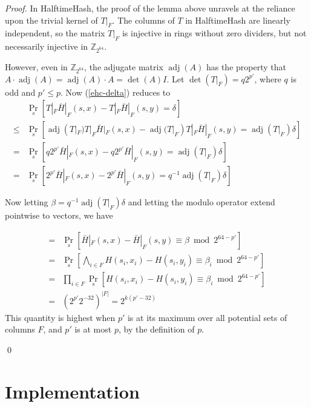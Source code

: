 \documentclass[runningheads]{llncs}
\DeclareMathOperator{\adj}{adj}
\newcommand{\ints}{\mathbb{Z}}
\begin{document}
\begin{proof}
  In HalftimeHash, the proof of the lemma above unravels at the reliance upon the trivial kernel of $T|_F$.
  The columns of $T$ in HalftimeHash are linearly independent, so the matrix $T|_F$ is injective in rings without zero dividers, but not necessarily injective in $\ints_{2^{64}}$.

  However, even in $\ints_{2^{64}}$, the adjugate matrix $\adj(A)$ has the property that $A \cdot \adj(A) = \adj(A) \cdot A = \det(A) I$.
  Let $\det(T|_F) = q2^{p'}$, where $q$ is odd and $p' \le p$.
  Now (\ref{ehc-delta}) reduces to
  \[
  \begin{array}{rl}
    &   \Pr_s[T|_F \bar{H}|_F(s,x) - T|_F \bar{H}|_F(s,y) = \delta]\\
    \leq &  \Pr_s[\adj(T|_F) T|_F \bar{H}|_F(s,x) - \adj(T|_F) T|_F \bar{H}|_F(s,y) = \adj(T|_F) \delta] \\
    = &  \Pr_s[q2^{p'}\bar{H}|_F(s,x) - q2^{p'}\bar{H}|_F(s,y) = \adj(T|_F) \delta] \\
    = &  \Pr_s[2^{p'}\bar{H}|_F(s,x) - 2^{p'}\bar{H}|_F(s,y) = q^{-1} \adj(T|_F) \delta]
  \end{array}
  \]

  Now letting $\beta = q^{-1} \adj(T|_F) \delta$ and letting the modulo operator extend pointwise to vectors, we have

  \[
  \begin{array}{rl}
    = &  \Pr_s[\bar{H}|_F(s,x) - \bar{H}|_F(s,y) \equiv \beta \bmod 2^{64-p'}] \\
    = &  \Pr_s\left[\bigwedge_{i \in F} H(s_i,x_i) - H(s_i,y_i) \equiv \beta_i \bmod 2^{64-p'}\right] \\
    = &  \prod_{i \in F} \Pr_s\left[ H(s_i,x_i) - H(s_i,y_i) \equiv \beta_i \bmod 2^{64-p'}\right] \\
    = & \left(2^{p'} 2^{-32}\right)^{|F|} = 2^{k(p'-32)}
  \end{array}
  \]
  This quantity is highest when $p'$ is at its maximum over all potential sets of columns $F$, and $p'$ is at most $p$, by the definition of $p$.

  \qed
\end{proof}


\section{Implementation}
\label{implementation}
\end{document}
